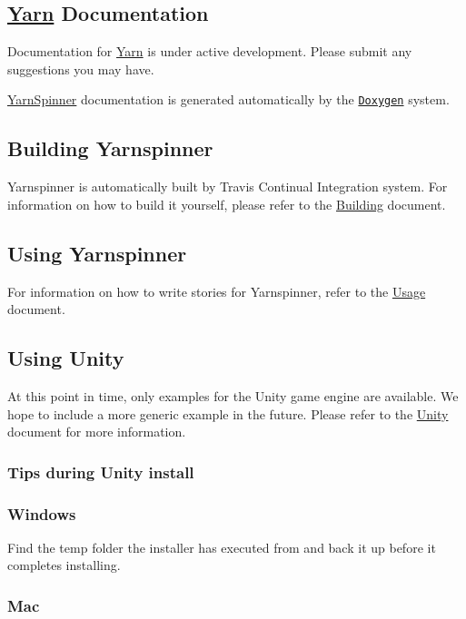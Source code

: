 \subsection*{\hyperlink{a00031}{Yarn} Documentation}

Documentation for \hyperlink{a00031}{Yarn} is under active development. Please submit any suggestions you may have.

\hyperlink{a00313}{Yarn\-Spinner} documentation is generated automatically by the \href{http://www.doxygen.org}{\tt Doxygen} system.

\subsection*{Building Yarnspinner}

Yarnspinner is automatically built by Travis Continual Integration system. For information on how to build it yourself, please refer to the \hyperlink{a00175}{Building} document.

\subsection*{Using Yarnspinner}

For information on how to write stories for Yarnspinner, refer to the \hyperlink{a00180}{Usage} document.

\subsection*{Using Unity}

At this point in time, only examples for the Unity game engine are available. We hope to include a more generic example in the future. Please refer to the \hyperlink{a00179}{Unity} document for more information.

\subsubsection*{Tips during Unity install}

\subsubsection*{Windows}

Find the temp folder the installer has executed from and back it up before it completes installing.

\subsubsection*{Mac}

